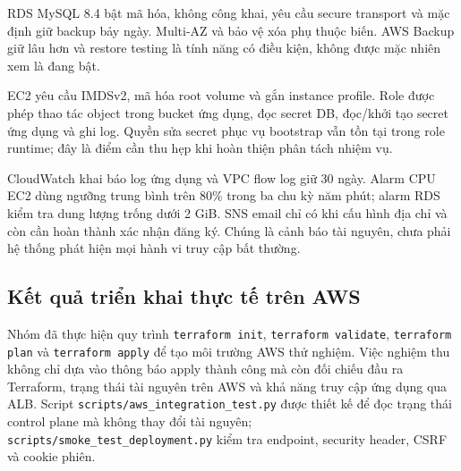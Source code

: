 RDS MySQL 8.4 bật mã hóa, không công khai, yêu cầu secure transport và mặc định giữ backup bảy ngày. Multi-AZ và bảo vệ xóa phụ thuộc biến. AWS Backup giữ lâu hơn và restore testing là tính năng có điều kiện, không được mặc nhiên xem là đang bật.

EC2 yêu cầu IMDSv2, mã hóa root volume và gắn instance profile. Role được phép thao tác object trong bucket ứng dụng, đọc secret DB, đọc/khởi tạo secret ứng dụng và ghi log. Quyền sửa secret phục vụ bootstrap vẫn tồn tại trong role runtime; đây là điểm cần thu hẹp khi hoàn thiện phân tách nhiệm vụ.

CloudWatch khai báo log ứng dụng và VPC flow log giữ 30 ngày. Alarm CPU EC2 dùng ngưỡng trung bình trên 80\% trong ba chu kỳ năm phút; alarm RDS kiểm tra dung lượng trống dưới 2 GiB. SNS email chỉ có khi cấu hình địa chỉ và còn cần hoàn thành xác nhận đăng ký. Chúng là cảnh báo tài nguyên, chưa phải hệ thống phát hiện mọi hành vi truy cập bất thường.

\subsection{Kết quả triển khai thực tế trên AWS}
Nhóm đã thực hiện quy trình \texttt{terraform init}, \texttt{terraform validate}, \texttt{terraform plan} và \texttt{terraform apply} để tạo môi trường AWS thử nghiệm. Việc nghiệm thu không chỉ dựa vào thông báo apply thành công mà còn đối chiếu đầu ra Terraform, trạng thái tài nguyên trên AWS và khả năng truy cập ứng dụng qua ALB. Script \texttt{scripts/aws\_integration\_test.py} được thiết kế để đọc trạng thái control plane mà không thay đổi tài nguyên; \texttt{scripts/smoke\_test\_deployment.py} kiểm tra endpoint, security header, CSRF và cookie phiên.

